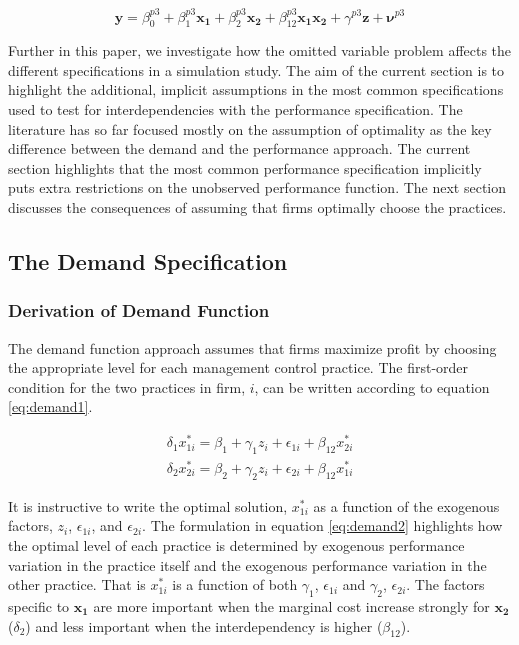 \documentclass[12pt]{article}
\begin{document}
\[
\mathbf{y} = \beta^{p3}_0 + \beta^{p3}_1 \mathbf{x_1} + \beta^{p3}_2 \mathbf{x_2}
  + \beta^{p3}_{12} \mathbf{x_1} \mathbf{x_2} + \gamma^{p3} \mathbf{z} +
  \mathbf{\nu}^{p3}
\]

Further in this paper, we investigate how the omitted variable problem
affects the different specifications in a simulation study. The aim of
the current section is to highlight the additional, implicit assumptions
in the most common specifications used to test for interdependencies
with the performance specification. The literature has so far focused
mostly on the assumption of optimality as the key difference between the
demand and the performance approach. The current section highlights that
the most common performance specification implicitly puts extra
restrictions on the unobserved performance function. The next section
discusses the consequences of assuming that firms optimally choose the
practices.

\subsection{The Demand Specification}\label{the-demand-specification}

\subsubsection{Derivation of Demand
Function}\label{derivation-of-demand-function}

The demand function approach assumes that firms maximize profit by
choosing the appropriate level for each management control practice. The
first-order condition for the two practices in firm, \(i\), can be
written according to equation \eqref{eq:demand1}.

\begin{align}\label{eq:demand1}
\delta_1 x^*_{1i} = \beta_1 + \gamma_1 z_i + \epsilon_{1i} + \beta_{12} x^*_{2i}
\\
\delta_2 x^*_{2i} = \beta_2 + \gamma_2 z_i + \epsilon_{2i} + \beta_{12} x^*_{1i}
\nonumber
\end{align}

It is instructive to write the optimal solution, \(x^*_{1i}\) as a
function of the exogenous factors, \(z_i\), \(\epsilon_{1i}\), and
\(\epsilon_{2i}\). The formulation in equation \eqref{eq:demand2}
highlights how the optimal level of each practice is determined by
exogenous performance variation in the practice itself and the exogenous
performance variation in the other practice. That is \(x^*_{1i}\) is a
function of both \(\gamma_1\), \(\epsilon_{1i}\) and \(\gamma_2\),
\(\epsilon_{2i}\). The factors specific to \(\mathbf{x_1}\) are more
important when the marginal cost increase strongly for \(\mathbf{x_2}\)
(\(\delta_2\)) and less important when the interdependency is higher
(\(\beta_{12}\)).
\end{document}
